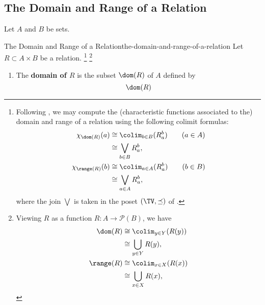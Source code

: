 \subsection{The Domain and Range of a Relation}\label{subsection-the-domain-and-range-of-a-relation}
Let $A$ and $B$ be sets.
\begin{definition}{The Domain and Range of a Relation}{the-domain-and-range-of-a-relation}%
    Let $R\subset A\times B$ be a relation.%
    \footnote{%
        Following , we may compute the (characteristic functions associated to the) domain and range of a relation using the following colimit formulas:
        \begin{align*}
            \chi_{\dom(R)}(a)   &\cong \colim_{b\in B}(R^{b}_{a})\qquad(a\in A)\\
                                &\cong \bigvee_{b\in B}R^{b}_{a},\\
            \chi_{\range(R)}(b) &\cong \colim_{a\in A}(R^{b}_{a})\qquad(b\in B)\\
                                &\cong \bigvee_{a\in A}R^{b}_{a},
        \end{align*}
        where the join $\bigvee$ is taken in the poset $(\TV,\preceq)$ of .
    }%
    \footnote{%
        Viewing $R$ as a function $R\colon A\to\mathcal{P}(B)$, we have
        \begin{align*}
            \dom(R)   &\cong \colim_{y\in Y}(R(y))\\
                      &\cong \bigcup_{y\in Y}R(y),\\
            \range(R) &\cong \colim_{x\in X}(R(x))\\
                      &\cong \bigcup_{x\in X}R(x),
        \end{align*}
        \par\vspace*{\TCBBoxCorrection}
    }%
    \begin{enumerate}
        \item\label{the-domain-of-a-relation}The \textbf{domain of $R$} is the subset $\dom(R)$ of $A$ defined by
            \[
                \dom(R)%
\]
\end{enumerate}
\end{definition}
